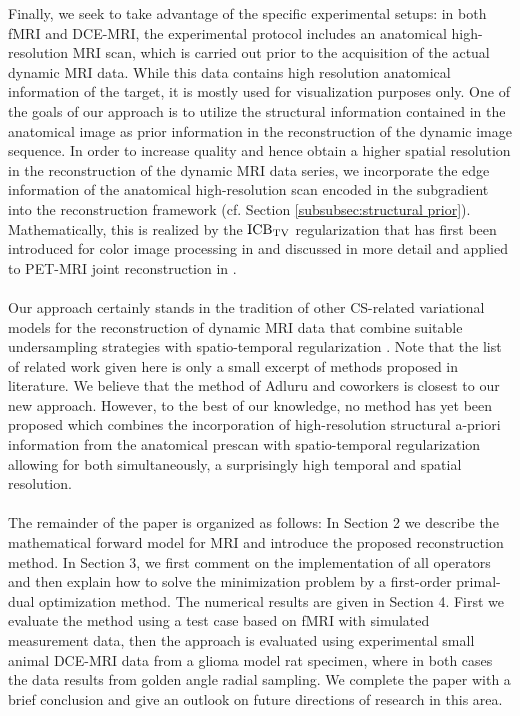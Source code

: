 Finally, we seek to take advantage of the specific experimental setups:
in both fMRI and DCE-MRI, the experimental protocol includes an anatomical high-resolution MRI scan, which is carried out prior to the acquisition of the actual dynamic MRI data. 
While this data contains high resolution anatomical information of the target, it is mostly used for visualization purposes only. 
One of the goals of our approach is to utilize the structural information contained in the anatomical image as prior information in the reconstruction of the dynamic image sequence.
In order to increase quality and hence obtain a higher spatial resolution in the reconstruction of the dynamic MRI data series, we incorporate the edge information of the anatomical high-resolution scan encoded in the subgradient into the reconstruction framework (cf. Section \ref{subsubsec:structural prior}). 
Mathematically, this is realized by the $\mathrm{ICB}_{\mathrm{TV}}$ regularization that has first been introduced for color image processing in \cite{Moeller:ColorBregmanTV} and discussed in more detail and applied to PET-MRI joint reconstruction in \cite{Rasch2017}.\\ 

\\
\noindent
Our approach certainly stands in the tradition of other CS-related variational models for the reconstruction of dynamic MRI data that combine suitable undersampling strategies with spatio-temporal regularization \cite{Lustig:ktSPARSE,Adluru2007_2,Jung:ktFOCUSS,Tremoulheac:lowRankPlusSparsePrior,Otazo:lowRankPlusSparseMatrixDecomposition,Yao:nuclearNormdMRI,feng2013,feng2014,wundrak2016}. 
Note that the list of related work given here is only a small excerpt of methods proposed in literature. 
We believe that the method of Adluru and coworkers \cite{Adluru2007_2} is closest to our new approach.
However, to the best of our knowledge, no method has yet been proposed which combines the incorporation of high-resolution structural a-priori information from the anatomical prescan with spatio-temporal regularization allowing for both simultaneously, a surprisingly high temporal and spatial resolution.\\

\\
\noindent
The remainder of the paper is organized as follows: In Section 2 we describe the mathematical forward model for MRI and introduce the proposed reconstruction method.  
In Section 3, we first comment on the implementation of all operators and then explain how to solve the minimization problem by a first-order primal-dual optimization method. 
The numerical results are given in Section 4. 
First we evaluate the method using a test case based on fMRI with simulated measurement data, then the approach is evaluated using experimental small animal DCE-MRI data from a glioma model rat specimen, where in both cases the data results from golden angle radial sampling. 
We complete the paper with a brief conclusion and give an outlook on future directions of research in this area. 